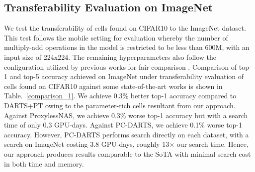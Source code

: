 \documentclass[onecolumn]{IEEEtran}
\begin{document}
\subsection{Transferability Evaluation on ImageNet}
We test the transferability of cells found on CIFAR10 to the ImageNet dataset. This test follows the mobile setting for evaluation whereby the number of multiply-add operations in the model is restricted to be less than 600M, with an input size of 224x224. The remaining hyperparameters also follow the configuration utilized by previous works for fair comparison \cite{Liu2018, Wang2021}. Comparison of top-1 and top-5 accuracy achieved on ImageNet under transferability evaluation of cells found on CIFAR10 against some state-of-the-art works is shown in Table.~\ref{comparison_1}. We achieve 0.3\% better top-1 accuracy compared to DARTS+PT owing to the parameter-rich cells resultant from our approach. Against ProxylessNAS, we achieve 0.3\% worse top-1 accuracy but with a search time of only 0.3 GPU-days. Against PC-DARTS, we achieve 0.1\% worse top-1 accuracy. However, PC-DARTS performs search directly on each dataset, with a search on ImageNet costing 3.8 GPU-days, roughly 13× our search time. Hence, our approach produces results comparable to the SoTA with minimal search cost in both time and memory.
\end{document}
